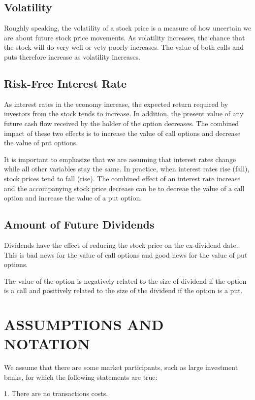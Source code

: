 \documentclass{article}
\begin{document}
\subsection{Volatility}
Roughly speaking, the volatility of a stock price is a measure of how uncertain we are about future stock price movements. As volatility increases, the chance that the stock will do very well or vety poorly increases. The value of both calls and puts therefore increase as volatility increases.

\subsection{Risk-Free Interest Rate}
As interest rates in the economy increase, the expected return required by investors from the stock tends to increase. In addition, the present value of any future cash flow received by the holder of the option decreases. The combined impact of these two effects is to increase the value of call options and decrease the value of put options.

It is important to emphasize that we are assuming that interest rates change while all other variables stay the same. In practice, when interest rates rise (fall), stock prices tend to fall (rise). The combined effect of an interest rate increase and the accompanying stock price decrease can be to decreae the value of a call option and increase the value of a put option.

\subsection{Amount of Future Dividends}
Dividends have the effect of reducing the stock price on the ex-dividend date. This is bad news for the value of call options and good news for the value of put options.

The value of the option is negatively related to the size of dividend if the option is a call and positively related to the size of the dividend if the option is a put.

\section{ASSUMPTIONS AND NOTATION}
We assume that there are some market participants, such as large investment banks, for which the following statements are true:

\hspace*{\fill}

1. There are no transactions costs.
\end{document}
